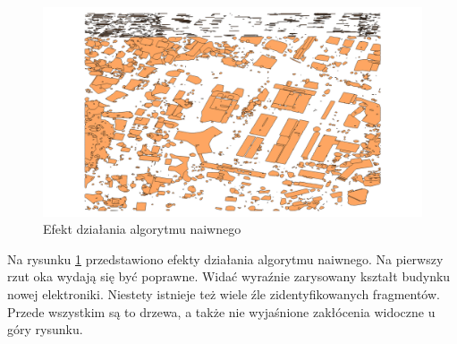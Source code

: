\begin{figure}[h!]
    \centering
    \includegraphics[width=\linewidth]{img/wynik_naiwny.png}
    \caption{Efekt działania algorytmu naiwnego}
    \label{fig:wynik_naiwny}
\end{figure}

Na rysunku \ref{fig:wynik_naiwny} przedstawiono efekty działania algorytmu naiwnego.
Na pierwszy rzut oka wydają się być poprawne. Widać wyraźnie zarysowany kształt budynku
nowej elektroniki. Niestety istnieje też wiele źle zidentyfikowanych fragmentów. Przede
wszystkim są to drzewa, a także nie wyjaśnione zakłócenia widoczne u góry rysunku.

